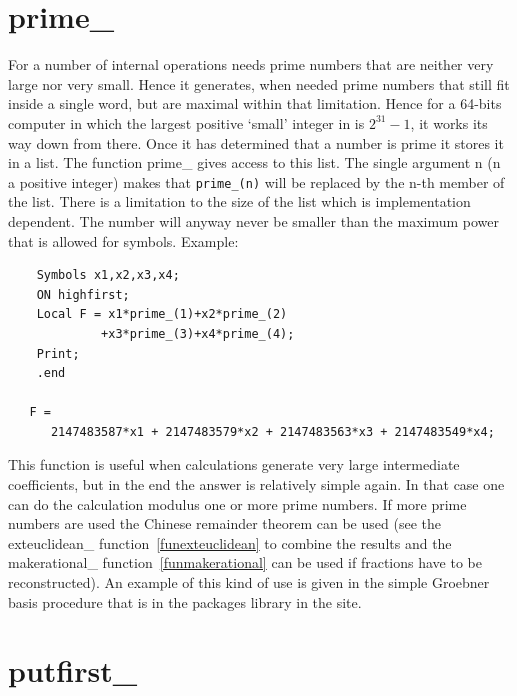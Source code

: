 
\section{prime\_}
\label{funprime}

\noindent For a number of internal operations \FORM{} needs prime numbers that 
are neither very large nor very small. Hence it generates, when needed 
prime numbers that still fit inside a single \FORM{} word, but are maximal 
within that limitation. Hence for a 64-bits computer in which the largest 
positive `small' integer in \FORM{} is $2^{31}-1$, it works its way down from 
there. Once it has determined that a number is prime it stores it in a 
list. The function prime\_ gives access to this list. The single argument 
n (n a positive integer) makes that \verb:prime_(n): will be replaced by 
the n-th member of the list. There is a limitation to the size of the list 
which is implementation dependent. The number will anyway never be smaller 
than the maximum power that is allowed for symbols. Example:
\begin{verbatim}
    Symbols x1,x2,x3,x4;
    ON highfirst;
    Local F = x1*prime_(1)+x2*prime_(2)
             +x3*prime_(3)+x4*prime_(4);
    Print;
    .end

   F =
      2147483587*x1 + 2147483579*x2 + 2147483563*x3 + 2147483549*x4;
\end{verbatim}
This function is useful when calculations generate very large intermediate 
coefficients, but in the end the answer is relatively simple again. In that 
case one can do the calculation modulus one or more prime numbers. If more 
prime numbers are used the Chinese remainder theorem can be used (see the exteuclidean\_ 
function~\ref{funexteuclidean} to combine the results and the 
makerational\_ function~\ref{funmakerational} can be used if fractions have 
to be reconstructed). An example of this kind of use is given in the simple 
Groebner basis procedure that is in the packages library in the \FORM{} site.


\section{putfirst\_}
\label{funputfirst}

